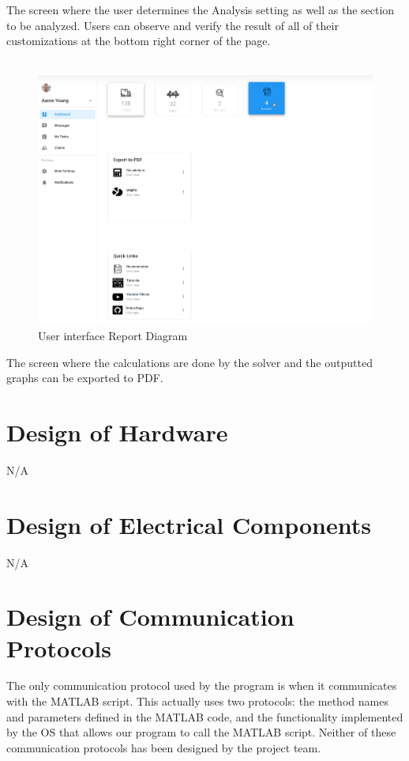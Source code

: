 \documentclass[12pt, titlepage]{article}
\begin{document}
The screen where the user determines the Analysis setting as well as the section to be analyzed. Users can observe and verify the result of all of their customizations at the bottom right corner of the page.\\\\
\begin{figure}[H]
  \centering
  \includegraphics[width=1\textwidth]{../images/Userinterface-Report.PNG}
  \caption{User interface Report Diagram}
  \label{fig:userinterface-report-diagram}
\end{figure}
The screen where the calculations are done by the solver and the outputted graphs can be exported to PDF.

\section{Design of Hardware}
N/A

\section{Design of Electrical Components}
N/A

\section{Design of Communication Protocols}

The only communication protocol used by the program is when it communicates with the MATLAB script. This actually uses two protocols: the method names and parameters defined in the MATLAB code, and the functionality implemented by the OS that allows our program to call the MATLAB script. Neither of these communication protocols has been designed by the project team.
\end{document}
